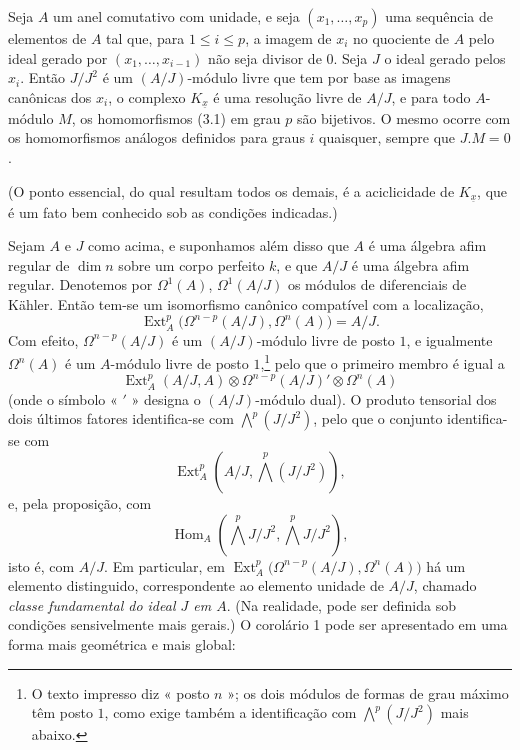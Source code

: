  Seja $A$ um anel comutativo com unidade, e seja
$(x_1,\ldots,x_p)$ uma sequência de elementos de $A$ tal que, para $1\leq i\leq p$,
a imagem de $x_i$ no quociente de $A$ pelo ideal gerado por
$(x_1,\ldots,x_{i-1})$ não seja divisor de $0$. Seja $J$ o ideal gerado
pelos $x_i$. Então $J/J^{2}$ é um $(A/J)$-módulo livre que tem por base as
imagens canônicas dos $x_i$, o complexo $K_{\underline{x}}$ é uma resolução
livre de $A/J$, e para todo $A$-módulo $M$, os homomorfismos (3.1) em
grau $p$ são bijetivos. O mesmo ocorre com os homomorfismos análogos
definidos para graus $i$ quaisquer, sempre que $J.M=0$.

(O ponto essencial, do qual resultam todos os demais, é a aciclicidade de
$K_{\underline{x}}$, que é um fato bem conhecido sob as condições indicadas.)

 Sejam $A$ e $J$ como acima, e suponhamos além disso que
$A$ é uma álgebra afim regular de $\dim n$ sobre um corpo perfeito $k$, e
que $A/J$ é uma álgebra afim regular. Denotemos por $\Omega^{1}(A)$,
$\Omega^{1}(A/J)$ os módulos de diferenciais de Kähler. Então tem-se um
isomorfismo canônico compatível com a localização,
\begin{equation}\tag{3.5}
  \operatorname{Ext}_{A}^{p}\bigl(\Omega^{n-p}(A/J),\Omega^{n}(A)\bigr)=A/J.
\end{equation}
Com efeito, $\Omega^{n-p}(A/J)$ é um $(A/J)$-módulo livre de posto $1$, e igualmente
$\Omega^{n}(A)$ é um $A$-módulo livre de posto $1$,\footnote{O texto impresso
diz « posto $n$ »; os dois módulos de formas de grau máximo têm posto
$1$, como exige também a identificação com $\bigwedge^{p}(J/J^{2})$ mais abaixo.}
pelo que o primeiro membro é igual a
\[
  \operatorname{Ext}_{A}^{p}(A/J,A)
  \otimes\Omega^{n-p}(A/J)'\otimes\Omega^{n}(A)
\]
(onde o símbolo « $'$ » designa o $(A/J)$-módulo dual). O produto tensorial dos
dois últimos fatores identifica-se com $\bigwedge^{p}(J/J^{2})$, pelo que o conjunto
identifica-se com
\[
  \operatorname{Ext}_{A}^{p}\!\left(A/J,\bigwedge^{p}(J/J^{2})\right),
\]
e, pela proposição, com
\[
  \operatorname{Hom}_{A}\!\left(\bigwedge^{p}J/J^{2},
  \bigwedge^{p}J/J^{2}\right),
\]
isto é, com $A/J$. Em particular, em
$\operatorname{Ext}_{A}^{p}\bigl(\Omega^{n-p}(A/J),\Omega^{n}(A)\bigr)$ há um
elemento distinguido, correspondente ao elemento unidade de $A/J$, chamado
\emph{classe fundamental do ideal $J$ em $A$}. (Na realidade, pode
ser definida sob condições sensivelmente mais gerais.) O
corolário 1 pode ser apresentado em uma forma mais geométrica e mais global:

